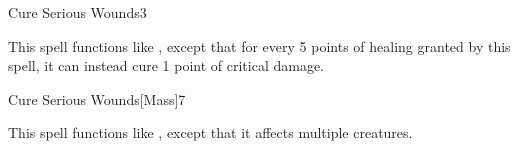 \begin{spellsection}{Cure Serious Wounds}{3}
    \begin{spellheader}
    \end{spellheader}
    \begin{spellcontent}
        \begin{spelltargetinginfo}
        \end{spelltargetinginfo}
        \begin{spelleffects}
            \spellspecial This spell functions like , except that for every 5 points of healing granted by this spell, it can instead cure 1 point of critical damage.
        \end{spelleffects}
    \end{spellcontent}
    \begin{spellfooter}
        \miscastrandom
    \end{spellfooter}
\end{spellsection}

\begin{spellsection}{Cure Serious Wounds}[Mass]{7}
    \begin{spellheader}
    \end{spellheader}
    \begin{spellcontent}
        \begin{spelltargetinginfo}
        \end{spelltargetinginfo}
        \begin{spelleffects}
            \spellspecial This spell functions like , except that it affects multiple creatures.
        \end{spelleffects}
    \end{spellcontent}
    \begin{spellfooter}
        \miscastexplode
    \end{spellfooter}
\end{spellsection}

